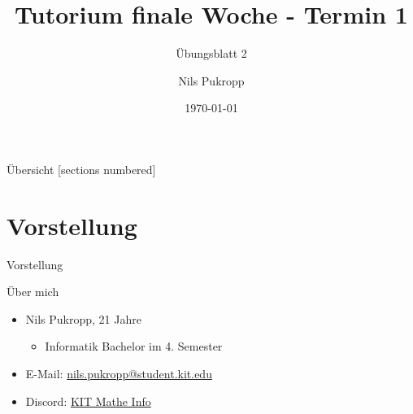 \documentclass[aspectratio=169]{beamer}
\title{\color{classcolor}Tutorium finale Woche - Termin 1}
\subtitle{Übungsblatt 2}
\date{\today}
\author{Nils Pukropp}
\institute{INSTITUT FÜR PROGRAMMSTRUKTUREN UND DATENORGANISATION}
\begin{document}
\maketitle

\begin{frame}{Übersicht}
  [sections numbered]
  \tableofcontents[hideallsubsections]
\end{frame}

\section{Vorstellung}
\begin{frame}[fragile]{Vorstellung}
  \begin{block}{Über mich}
  \begin{itemize}
    \item Nils Pukropp, 21 Jahre
    \begin{itemize}
      \item Informatik Bachelor im 4. Semester
    \end{itemize}
    \item E-Mail: \href{mailto:nils.pukropp@student.kit.edu}{nils.pukropp@student.kit.edu}
    \item Discord: \href{https://discord.gg/6GpaFE8w4y}{KIT Mathe Info}
  \end{itemize}
\end{block}
\end{frame}
\end{document}
